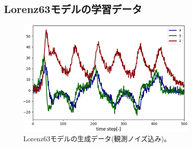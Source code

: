 \documentclass[dvipdfmx, 9pt, a4paper]{jsarticle}
\begin{document}
\subsection{Lorenz63モデルの学習データ}
\begin{figure}[b]
\begin{center}
\includegraphics[width=9cm]{"fig11.png"}
\caption{Lorenz63モデルの生成データ(観測ノイズ込み)。}
\end{center}
\end{figure}
\end{document}
